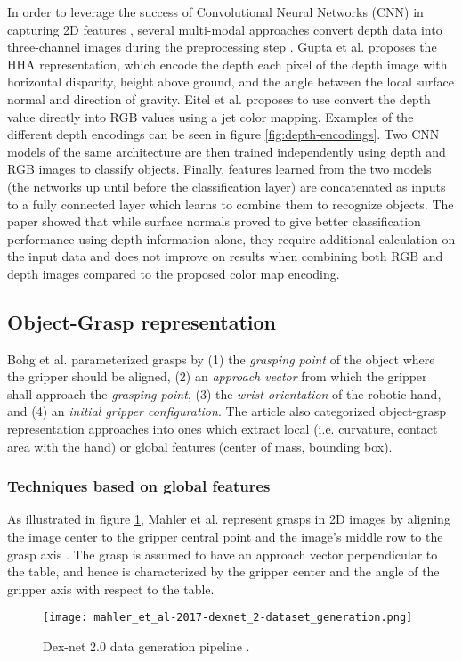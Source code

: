 In order to leverage the success of Convolutional Neural Networks (CNN) in capturing 2D features \cite{Gu2018}, several
multi-modal approaches convert depth data into three-channel images during the preprocessing step
\cite{Eitel2015,Gupta2014RGBDFeatures}. Gupta et al. \cite{Gupta2014RGBDFeatures} proposes the HHA representation, which
encode the depth each pixel of the depth image with horizontal disparity, height above ground, and the angle between the
local surface normal and direction of gravity. Eitel et al. \cite{Eitel2015} proposes to use convert the depth value
directly into RGB values using a jet color mapping. Examples of the different depth encodings can be seen in figure
\ref{fig:depth-encodings}. Two CNN models of the same architecture are then trained independently using depth and RGB
images to classify objects. Finally, features learned from the two models (the networks up until before the
classification layer) are concatenated as inputs to a fully connected layer which learns to combine them to recognize
objects. The paper showed that while surface normals proved to give better classification performance using depth
information alone, they require additional calculation on the input data and does not improve on results when combining
both RGB and depth images compared to the proposed color map encoding.

\subsection{Object-Grasp representation}
Bohg et al. \cite{Bohg2014} parameterized grasps by (1) the \emph{grasping point} of the object where the gripper
should be aligned, (2) an \emph{approach vector} from which the gripper shall approach the \emph{grasping point},
(3) the \emph{wrist orientation} of the robotic hand, and (4) an \emph{initial gripper configuration}.
The article also categorized object-grasp representation approaches into ones which extract local (i.e. curvature,
contact area with the hand) or global features (center of mass, bounding box).

\subsubsection*{Techniques based on global features}
As illustrated in figure \ref{fig:dexnet-data-gen}, Mahler et al. represent grasps in 2D images by aligning the image
center to the gripper central point and the image's middle row to the grasp axis \cite{mahler2017}. The grasp is assumed
to have an approach vector perpendicular to the table, and hence is characterized by the gripper center and the angle of
the gripper axis with respect to the table.
\begin{figure}[H]
    \centering
    \texttt{[image: mahler\_et\_al-2017-dexnet\_2-dataset\_generation.png]}
    \caption{Dex-net 2.0 data generation pipeline \cite{mahler2017}.}
    \label{fig:dexnet-data-gen}
\end{figure}

